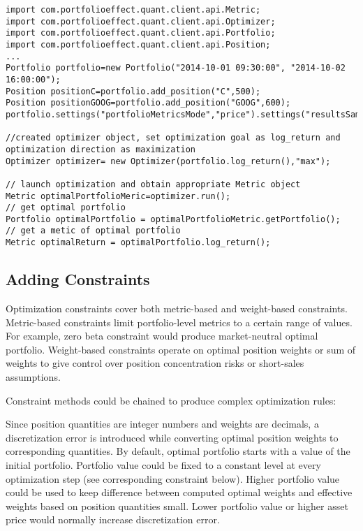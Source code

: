 \documentclass[letterpaper]{report}
\begin{document}
\begin{lstlisting}
import com.portfolioeffect.quant.client.api.Metric;
import com.portfolioeffect.quant.client.api.Optimizer;
import com.portfolioeffect.quant.client.api.Portfolio;
import com.portfolioeffect.quant.client.api.Position;
...
Portfolio portfolio=new Portfolio("2014-10-01 09:30:00", "2014-10-02 16:00:00");
Position positionC=portfolio.add_position("C",500);
Position positionGOOG=portfolio.add_position("GOOG",600);	
portfolio.settings("portfolioMetricsMode","price").settings("resultsSamplingInterval","30m");

//created optimizer object, set optimization goal as log_return and optimization direction as maximization
Optimizer optimizer= new Optimizer(portfolio.log_return(),"max");

// launch optimization and obtain appropriate Metric object
Metric optimalPortfolioMeric=optimizer.run();
// get optimal portfolio
Portfolio optimalPortfolio = optimalPortfolioMetric.getPortfolio();
// get a metic of optimal portfolio
Metric optimalReturn = optimalPortfolio.log_return();

\end{lstlisting}


\subsection{Adding Constraints}
Optimization constraints cover both metric-based and weight-based
constraints. Metric-based constraints limit portfolio-level metrics to a certain
range of values. For example, zero beta constraint would produce market-neutral optimal portfolio.
Weight-based constraints operate on optimal position weights or sum of weights to 
give control over position concentration risks or short-sales assumptions.
\par
Constraint methods could be chained to produce complex optimization rules:
  \par
Since position quantities are integer numbers and weights are decimals, a discretization error is introduced while converting optimal position weights to corresponding quantities. 
By default, optimal portfolio starts with a value of the initial portfolio. 
Portfolio value could be fixed to a constant level at every optimization step
(see corresponding constraint below).
Higher portfolio value could be used to keep difference between computed optimal weights and effective weights based on position quantities small.
Lower portfolio value or higher asset price would normally increase discretization error.
\end{document}
